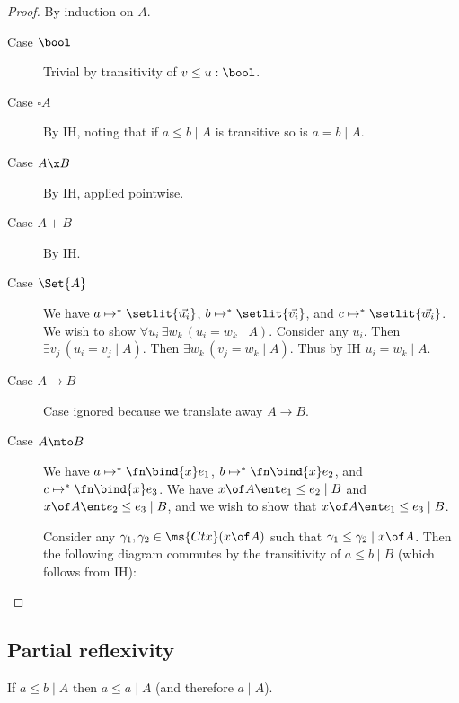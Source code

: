 \documentclass{article}
\newcommand{\step}{\mapsto}
\newcommand{\steps}{\step^*}
\newcommand{\disc}[1]{\square{#1}}
\newcommand{\lr}[2]{#2\mathrel{|}#1}
\newcommand{\lrcx}[3]{#1 \ent \lr{#2}{#3}}
\begin{document}
\begin{proof}
  By induction on $A$.
  \begin{description}
    \item[Case $\bool$] Trivial by transitivity of $v \le u : \bool$.
    \item[Case $\disc A$] By IH, noting that if $\lr{A}{a \le b}$ is transitive
      so is $\lr{A}{a = b}$.
    \item[Case $A \x B$] By IH, applied pointwise. 
    \item[Case $A + B$] By IH. 
    \item[Case $\Set{A}$] We have $a \steps \setlit{\vec{u_i}}$, $b \steps
      \setlit{\vec{v_i}}$, and $c \steps \setlit{\vec{w_i}}$. We wish to show
      $\forall u_i\, \exists w_k\, (\lr{A}{u_i = w_k})$. Consider any $u_i$.
      Then $\exists v_j\, (\lr{A}{u_i = v_j})$. Then $\exists w_k\, (\lr{A}{v_j
        = w_k})$. Thus by IH $\lr{A}{u_i = w_k}$.
    \item[Case $A \to B$] Case ignored because we translate away $A \to B$.
    \item[Case $A \mto B$] We have $a \steps \fn\bind{x}e_1$, $b \steps
      \fn\bind{x}e_2$, and $c \steps \fn\bind{x}e_3$. We have $\lrcx{x \of
        A}{B}{e_1 \le e_2}$ and $\lrcx{x \of A}{B}{e_2 \le e_3}$, and we wish to
      show that $\lrcx{x\of A}{B}{e_1 \le e_3}$.

      Consider any $\gamma_1, \gamma_2 \in \ms{Ctx}(x \of A)$ such that $\lr{x
        \of A}{\gamma_1 \le \gamma_2}$. Then the following diagram commutes by
      the transitivity of $\lr{B}{a \le b}$ (which follows from IH):
  \end{description}
\end{proof}


\subsection{Partial reflexivity}
\begin{theorem}\label{thm:prefl}
  If $\lr{A}{a \le b}$ then $\lr{A}{a \le a}$ (and therefore $\lr{A}{a}$).
\end{theorem}
\end{document}
